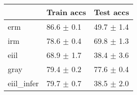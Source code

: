 \begin{tabular}{lll}
\toprule
{} &      Train accs &       Test accs \\
\midrule
erm        &  86.6 $\pm$ 0.1 &  49.7 $\pm$ 1.4 \\
irm        &  78.6 $\pm$ 0.4 &  69.8 $\pm$ 1.3 \\
eiil       &  68.9 $\pm$ 1.7 &  38.4 $\pm$ 3.6 \\
gray       &  79.4 $\pm$ 0.2 &  77.6 $\pm$ 0.4 \\
eiil_infer &  79.7 $\pm$ 0.7 &  38.5 $\pm$ 2.0 \\
\bottomrule
\end{tabular}

